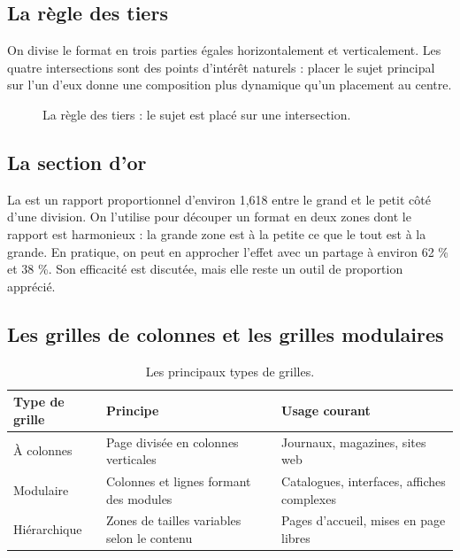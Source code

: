 \subsection{La règle des tiers}

On divise le format en trois parties égales horizontalement et verticalement. Les quatre intersections sont des points d'intérêt naturels : placer le sujet principal sur l'un d'eux donne une composition plus dynamique qu'un placement au centre.

\begin{figure}[ht]
\centering
{}
\caption{La règle des tiers : le sujet est placé sur une intersection.}
\end{figure}

\subsection{La section d'or}

La  est un rapport proportionnel d'environ 1,618 entre le grand et le petit côté d'une division. On l'utilise pour découper un format en deux zones dont le rapport est harmonieux : la grande zone est à la petite ce que le tout est à la grande. En pratique, on peut en approcher l'effet avec un partage à environ 62 \% et 38 \%. Son efficacité est discutée, mais elle reste un outil de proportion apprécié.

\subsection{Les grilles de colonnes et les grilles modulaires}

\begin{table}[h!]
\centering
\begin{tabular}{@{}p{3.5cm}p{5cm}p{5.5cm}@{}}
\toprule
\textbf{Type de grille} & \textbf{Principe} & \textbf{Usage courant} \\
\midrule
À colonnes & Page divisée en colonnes verticales & Journaux, magazines, sites web \\
Modulaire & Colonnes et lignes formant des modules & Catalogues, interfaces, affiches complexes \\
Hiérarchique & Zones de tailles variables selon le contenu & Pages d'accueil, mises en page libres \\
\bottomrule
\end{tabular}
\caption{Les principaux types de grilles.}
\end{table}

